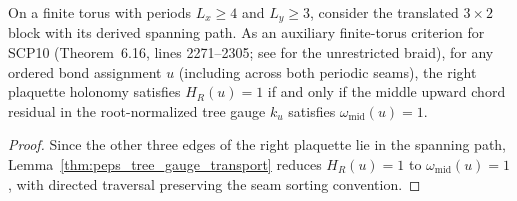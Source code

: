 \begin{lemma}
    \label{thm:peps_actual_horizontal_vacancy}
    \leanok
    On a finite torus with periods $L_x\ge 4$ and $L_y\ge 3$, consider the translated $3\times 2$ block with its derived spanning path.
    As an auxiliary finite-torus criterion for SCP10 (Theorem~6.16, lines 2271--2305; see \cite{gap:rmp_peps_quantum_double_g_isometry} for the unrestricted braid), for any ordered bond assignment $u$ (including across both periodic seams), the right plaquette holonomy satisfies $H_R(u)=1$ if and only if the middle upward chord residual in the root-normalized tree gauge $k_u$ satisfies $\omega_{\mathrm{mid}}(u)=1$.
\end{lemma}
\begin{proof}\leanok
    Since the other three edges of the right plaquette lie in the spanning path, Lemma~\ref{thm:peps_tree_gauge_transport} reduces $H_R(u)=1$ to $\omega_{\mathrm{mid}}(u)=1$, with directed traversal preserving the seam sorting convention.
\end{proof}

